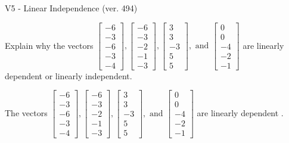 \begin{exercise}
  \begin{exerciseTitle}V5 - Linear Independence (ver. 494)\end{exerciseTitle}
  \begin{exerciseStatement}
    Explain why the vectors \(\left[\begin{array}{r}
-6 \\
-3 \\
-6 \\
-3 \\
-4
\end{array}\right] , \left[\begin{array}{r}
-6 \\
-3 \\
-2 \\
-1 \\
-3
\end{array}\right] , \left[\begin{array}{r}
3 \\
3 \\
-3 \\
5 \\
5
\end{array}\right] , \text{ and } \left[\begin{array}{r}
0 \\
0 \\
-4 \\
-2 \\
-1
\end{array}\right]\) are linearly dependent or linearly independent.	


  \end{exerciseStatement}
  \begin{exerciseAnswer}
   The vectors \(\left[\begin{array}{r}
-6 \\
-3 \\
-6 \\
-3 \\
-4
\end{array}\right] , \left[\begin{array}{r}
-6 \\
-3 \\
-2 \\
-1 \\
-3
\end{array}\right] , \left[\begin{array}{r}
3 \\
3 \\
-3 \\
5 \\
5
\end{array}\right] , \text{ and } \left[\begin{array}{r}
0 \\
0 \\
-4 \\
-2 \\
-1
\end{array}\right]\) are 
  	 linearly dependent  .
  


  \end{exerciseAnswer}
\end{exercise}